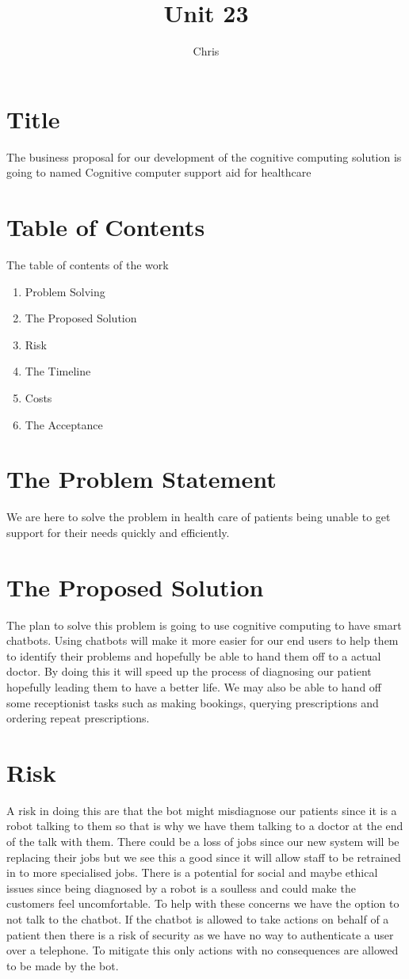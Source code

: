\documentclass{article}
\title{Unit 23}
\author{Chris}
\date{}
\begin{document}
\section{Title}
The business proposal for our development of the cognitive computing solution is going to named 
Cognitive computer support aid for healthcare

\section{Table of Contents}
The table of contents of the work
\begin{enumerate}
	\item	Problem Solving
	\item	The Proposed Solution
	\item 	Risk
	\item The Timeline
	\item Costs
	\item The Acceptance
\end{enumerate}

\section{The Problem Statement}
We are here to solve the problem in health care of patients being unable to get support for their needs quickly and efficiently.

\section{The Proposed Solution}
The plan to solve this problem is going to use cognitive computing to have smart chatbots. Using chatbots will make it more easier for our end users to help them to identify their problems and hopefully be able to hand them off to a actual doctor. By doing this it will speed up the process of diagnosing our patient hopefully leading them to have a better life. We may also be able to hand off some receptionist tasks such as making bookings, querying prescriptions and ordering repeat prescriptions.

\section{Risk}
A risk in doing this are that the bot might misdiagnose our patients since it is a robot talking to them so that is why we have them talking to a doctor at the end of the talk with them. There could be a loss of jobs since our new system will be replacing their jobs but we see this a good since it will allow staff to be retrained in to more specialised jobs. 
There is a potential for social and maybe ethical issues since being diagnosed by a robot is a soulless and could make the customers feel uncomfortable. To help with these concerns we have the option to not talk to the chatbot.
If the chatbot is allowed to take actions on behalf of a patient then there is a risk of security as we have no way to authenticate a user over a telephone. To mitigate this only actions with no consequences are allowed to be made by the bot.
\end{document}

